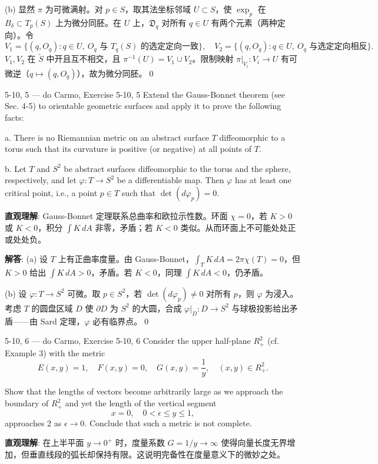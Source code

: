 \begin{Remark}
\begin{solution}
(b) 显然 $\pi$ 为可微满射。对 $p\in S$，取其法坐标邻域 $U\subset S$，使 $\exp_p$ 在 $B_{\delta}\subset T_p(S)$ 上为微分同胚。在 $U$ 上，$\mathfrak{D}_q$ 对所有 $q\in U$ 有两个元素（两种定向）。令
\[
V_1=\{(q,O_q):q\in U,\ O_q\text{ 与 }T_q(S)\text{ 的选定定向一致}\},\quad
V_2=\{(q,O_q):q\in U,\ O_q\text{ 与选定定向相反}\}.
\]
$V_1,V_2$ 在 $\tilde{S}$ 中开且互不相交，且 $\pi^{-1}(U)=V_1\cup V_2$。限制映射 $\pi|_{V_i}:V_i\to U$ 有可微逆（$q\mapsto(q,O_q)$），故为微分同胚。\qed
\end{solution}

\begin{exercise}{5-10, 5 — do Carmo, Exercise 5-10, 5}
Extend the Gauss-Bonnet theorem (see Sec. 4-5) to orientable geometric surfaces and apply it to prove the following facts:

a. There is no Riemannian metric on an abstract surface $T$ diffeomorphic to a torus such that its curvature is positive (or negative) at all points of $T$.

b. Let $T$ and $S^2$ be abstract surfaces diffeomorphic to the torus and the sphere, respectively, and let $\varphi \colon T \to S^2$ be a differentiable map. Then $\varphi$ has at least one critical point, i.e., a point $p \in T$ such that $\det(d\varphi_p) = 0$.
\end{exercise}
\begin{solution}
\textbf{直观理解}: Gauss-Bonnet 定理联系总曲率和欧拉示性数。环面 $\chi=0$，若 $K>0$ 或 $K<0$，积分 $\int K\,dA$ 非零，矛盾；若 $K<0$ 类似。从而环面上不可能处处正或处处负。

\textbf{解答}: (a) 设 $T$ 上有正曲率度量。由 Gauss-Bonnet，$\int_T K\,dA = 2\pi\chi(T) = 0$，但 $K>0$ 给出 $\int K\,dA>0$，矛盾。若 $K<0$，同理 $\int K\,dA<0$，仍矛盾。

(b) 设 $\varphi: T\to S^2$ 可微。取 $p\in S^2$，若 $\det(d\varphi_p)\neq 0$ 对所有 $p$，则 $\varphi$ 为浸入。考虑 $T$ 的圆盘区域 $D$ 使 $\partial D$ 为 $S^2$ 的大圆，合成 $\varphi|_D: D\to S^2$ 与球极投影给出矛盾——由 Sard 定理，$\varphi$ 必有临界点。\qed
\end{solution}

\begin{exercise}{5-10, 6 — do Carmo, Exercise 5-10, 6}
Consider the upper half-plane $R_{+}^{2}$ (cf. Example 3) with the metric
\[
E (x, y) = 1, \quad F (x, y) = 0, \quad G (x, y) = \frac {1}{y}, \quad (x, y) \in R _ {+} ^ {2}.
\]

Show that the lengths of vectors become arbitrarily large as we approach the boundary of $R_{+}^{2}$ and yet the length of the vertical segment
\[
x = 0, \quad 0 < \epsilon \leq y \leq 1,
\]
approaches 2 as $\epsilon \to 0$. Conclude that such a metric is not complete.
\end{exercise}
\begin{solution}
\textbf{直观理解}: 在上半平面 $y\to 0^+$ 时，度量系数 $G=1/y\to\infty$ 使得向量长度无界增加，但垂直线段的弧长却保持有限。这说明完备性在度量意义下的微妙之处。


\end{solution}
\end{Remark}
